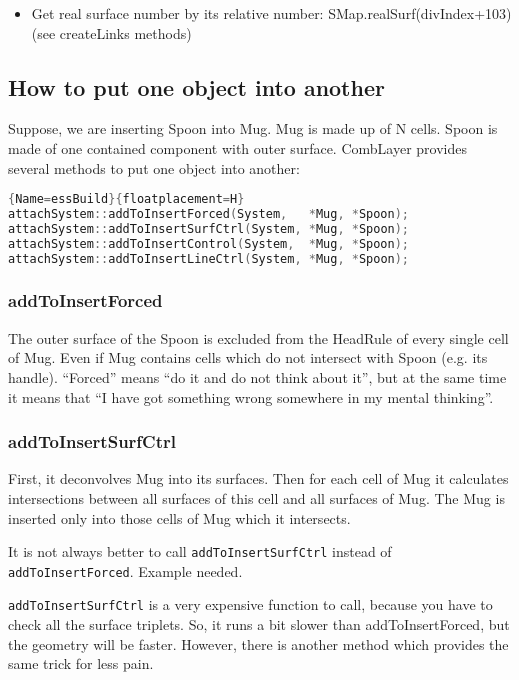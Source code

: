 \begin{itemize}
\item Get real surface number by its relative number: SMap.realSurf(divIndex+103) (see createLinks methods)
\end{itemize}

\subsection{How to put one object into another}

Suppose, we are inserting Spoon into Mug.
Mug is made up of N cells. Spoon is made of one contained component with outer surface.
CombLayer provides several methods to put one object into another:

\begin{lstlisting}[language=C++]{Name=essBuild}{floatplacement=H}
attachSystem::addToInsertForced(System,   *Mug, *Spoon);
attachSystem::addToInsertSurfCtrl(System, *Mug, *Spoon);
attachSystem::addToInsertControl(System,  *Mug, *Spoon);
attachSystem::addToInsertLineCtrl(System, *Mug, *Spoon);
\end{lstlisting}

\subsubsection{addToInsertForced}
The outer surface of the Spoon is excluded from the HeadRule of every single cell of Mug.
Even if Mug contains cells which do not intersect with Spoon (e.g. its handle).
``Forced'' means ``do it and do not think about it'', but at the same time it means that ``I have got something wrong somewhere in my mental thinking''.

\subsubsection{addToInsertSurfCtrl}
First, it deconvolves Mug into its surfaces.
Then for each cell of Mug it calculates intersections between all surfaces of this cell and all surfaces of Mug.
The Mug is inserted only into those cells of Mug which it intersects.

It is not always better to call {\tt addToInsertSurfCtrl} instead of {\tt addToInsertForced}. \alert{Example needed.}

{\tt addToInsertSurfCtrl} is a very expensive function to call, because you have to check all the surface triplets. So, it runs a bit slower than addToInsertForced, but the geometry will be faster.
However, there is another method which provides the same trick for less pain.

